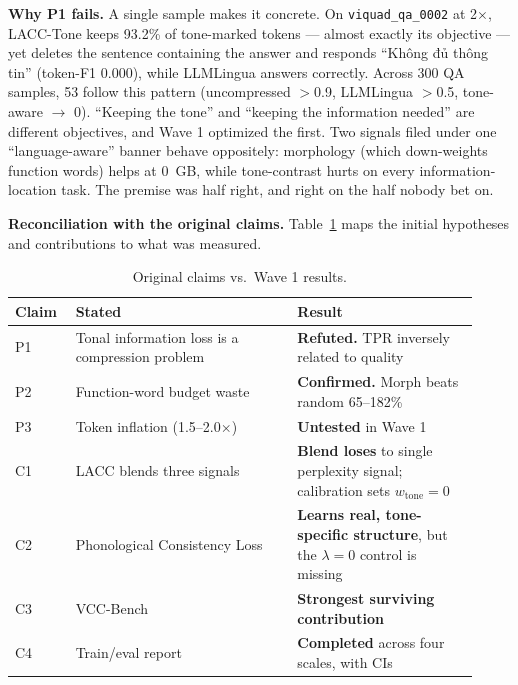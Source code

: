 \documentclass[runningheads]{llncs}
\begin{document}
\textbf{Why P1 fails.} A single sample makes it concrete. On \texttt{viquad\_qa\_0002} at 2$\times$, LACC-Tone keeps 93.2\% of tone-marked tokens --- almost exactly its objective --- yet deletes the sentence containing the answer and responds ``Không đủ thông tin'' (token-F1 0.000), while LLMLingua answers correctly. Across 300 QA samples, 53 follow this pattern (uncompressed $>$0.9, LLMLingua $>$0.5, tone-aware $\to$ 0). ``Keeping the tone'' and ``keeping the information needed'' are different objectives, and Wave 1 optimized the first. Two signals filed under one ``language-aware'' banner behave oppositely: morphology (which down-weights function words) helps at 0~GB, while tone-contrast hurts on every information-location task. The premise was half right, and right on the half nobody bet on.

\textbf{Reconciliation with the original claims.} Table~\ref{tab:reconcile} maps the initial hypotheses and contributions to what was measured.

\begin{table}[H]
\centering
\caption{Original claims vs.\ Wave 1 results.}
\label{tab:reconcile}
\begin{tabular}{p{0.12\linewidth}p{0.44\linewidth}p{0.36\linewidth}}
\toprule
\textbf{Claim} & \textbf{Stated} & \textbf{Result} \\
\midrule
P1 & Tonal information loss is a compression problem & \textbf{Refuted.} TPR inversely related to quality \\
P2 & Function-word budget waste & \textbf{Confirmed.} Morph beats random 65--182\% \\
P3 & Token inflation (1.5--2.0$\times$) & \textbf{Untested} in Wave 1 \\
C1 & LACC blends three signals & \textbf{Blend loses} to single perplexity signal; calibration sets $w_{\text{tone}}{=}0$ \\
C2 & Phonological Consistency Loss & \textbf{Learns real, tone-specific structure}, but the $\lambda{=}0$ control is missing \\
C3 & VCC-Bench & \textbf{Strongest surviving contribution} \\
C4 & Train/eval report & \textbf{Completed} across four scales, with CIs \\
\bottomrule
\end{tabular}
\end{table}
\end{document}
